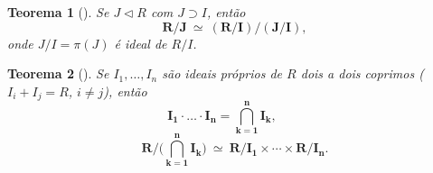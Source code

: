 \documentclass[11pt]{article}
\newcommand{\defname}[1]{\colorbox{yellow!30}{\strut \textbf{#1}}}
\newtheorem*{theorem}{Teorema}
\theoremstyle{definition}
\begin{document}
\begin{multicols}{3}
\begin{theorem}[\defname{Relação de Quocientes}]
Se \(J\triangleleft R\) com \(J\supset I\), então
\[
\mathbf{R/J \ \simeq\ (R/I)/(J/I)},
\]
onde \(J/I=\pi(J)\) é ideal de \(R/I\).
\end{theorem}

\begin{theorem}[\defname{Chinês dos Restos}]
Se \(I_1,\dots,I_n\) são ideais próprios de \(R\) dois a dois coprimos (\(I_i+I_j=R\), \(i\neq j\)), então
\[
\mathbf{I_1\cdot\ldots\cdot I_n=\bigcap_{k=1}^n I_k},\qquad 
\]
\[
\mathbf{R/\bigl(\bigcap_{k=1}^n I_k\bigr)\ \simeq\ R/I_1\times\cdots\times R/I_n}.
\]
\end{theorem}
\end{multicols}
\end{document}
